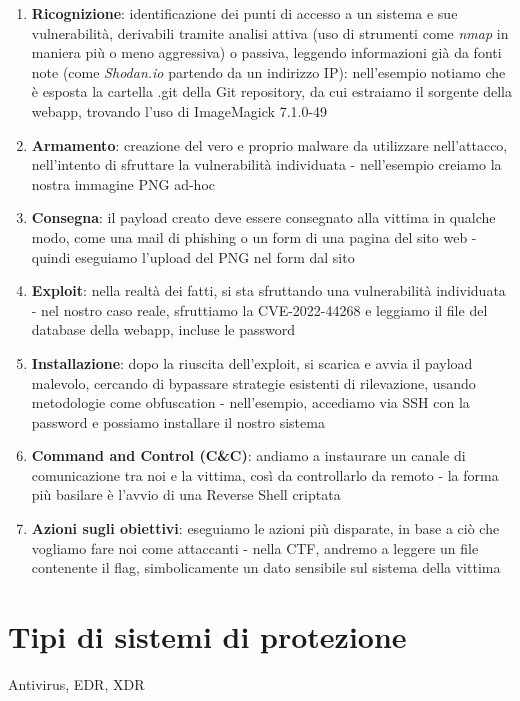 \begin{enumerate}
    \item \textbf{Ricognizione}: identificazione dei punti di accesso a un sistema e sue vulnerabilità, derivabili tramite analisi attiva (uso di strumenti come \emph{nmap} in maniera più o meno aggressiva) o passiva, leggendo informazioni già da fonti note (come \emph{Shodan.io} partendo da un indirizzo IP): nell'esempio notiamo che è esposta la cartella .git della Git repository, da cui estraiamo il sorgente della webapp, trovando l'uso di ImageMagick 7.1.0-49
    
    \item \textbf{Armamento}: creazione del vero e proprio malware da utilizzare nell'attacco, nell'intento di sfruttare la vulnerabilità individuata - nell'esempio creiamo la nostra immagine PNG ad-hoc

    \item \textbf{Consegna}: il payload creato deve essere consegnato alla vittima in qualche modo, come una mail di phishing o un form di una pagina del sito web - quindi eseguiamo l'upload del PNG nel form dal sito

    \item \textbf{Exploit}: nella realtà dei fatti, si sta sfruttando una vulnerabilità individuata - nel nostro caso reale, sfruttiamo la CVE-2022-44268 e leggiamo il file del database della webapp, incluse le password

    \item \textbf{Installazione}: dopo la riuscita dell'exploit, si scarica e avvia il payload malevolo, cercando di bypassare strategie esistenti di rilevazione, usando metodologie come obfuscation - nell'esempio, accediamo via SSH con la password e possiamo installare il nostro sistema

    \item \textbf{Command and Control (C\&C)}: andiamo a instaurare un canale di comunicazione tra noi e la vittima, così da controllarlo da remoto - la forma più basilare è l'avvio di una Reverse Shell criptata

    \item \textbf{Azioni sugli obiettivi}: eseguiamo le azioni più disparate, in base a ciò che vogliamo fare noi come attaccanti - nella CTF, andremo a leggere un file contenente il flag, simbolicamente un dato sensibile sul sistema della vittima
\end{enumerate}

\section{Tipi di sistemi di protezione}
Antivirus, EDR, XDR

